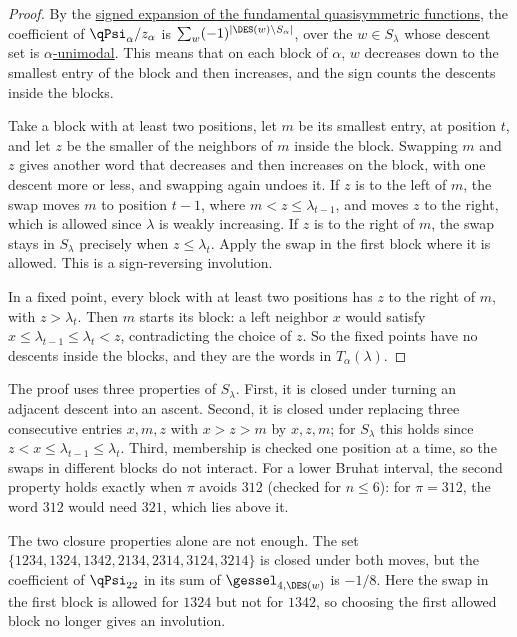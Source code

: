 \begin{proof}
By the \hyperref[gesselQuasiPowerSum]{signed expansion of the fundamental
quasisymmetric functions}, the coefficient of $\qPsi_\alpha/z_\alpha$ is
$\sum_w(-1)^{|\DES(w)\setminus S_\alpha|}$, over the $w\in S_\lambda$ whose
descent set is \hyperref[lambdaUnimodalSubset]{$\alpha$-unimodal}.  This means
that on each block of $\alpha$, $w$ decreases down to the smallest entry of the
block and then increases, and the sign counts the descents inside the blocks.

Take a block with at least two positions, let $m$ be its smallest entry, at
position $t$, and let $z$ be the smaller of the neighbors of $m$ inside the
block.  Swapping $m$ and $z$ gives another word that decreases and then
increases on the block, with one descent more or less, and swapping again
undoes it.  If $z$ is to the left of $m$, the swap moves $m$ to position $t-1$,
where $m<z\leq\lambda_{t-1}$, and moves $z$ to the right, which is allowed since
$\lambda$ is weakly increasing.  If $z$ is to the right of $m$, the swap stays
in $S_\lambda$ precisely when $z\leq\lambda_t$.  Apply the swap in the first
block where it is allowed.  This is a sign-reversing involution.

In a fixed point, every block with at least two positions has $z$ to the right
of $m$, with $z>\lambda_t$.  Then $m$ starts its block: a left neighbor $x$
would satisfy $x\leq\lambda_{t-1}\leq\lambda_t<z$, contradicting the choice of
$z$.  So the fixed points have no descents inside the blocks, and they are the
words in $T_\alpha(\lambda)$.
\end{proof}

\begin{remark}
The proof uses three properties of $S_\lambda$.  First, it is closed under
turning an adjacent descent into an ascent.  Second, it is closed under
replacing three consecutive entries $x,m,z$ with $x>z>m$ by $x,z,m$; for
$S_\lambda$ this holds since $z<x\leq\lambda_{t-1}\leq\lambda_t$.  Third,
membership is checked one position at a time, so the swaps in different
blocks do not interact.  For a lower Bruhat interval, the second property holds
exactly when $\pi$ avoids $312$ (checked for $n\leq6$): for $\pi=312$, the word
$312$ would need $321$, which lies above it.

The two closure properties alone are not enough.  The set
$\{1234,1324,1342,2134,2314,3124,3214\}$ is closed under both moves, but the
coefficient of $\qPsi_{22}$ in its sum of $\gessel_{4,\DES(w)}$ is $-1/8$.
Here the swap in the first block is allowed for $1324$ but not for $1342$, so
choosing the first allowed block no longer gives an involution.
\end{remark}

